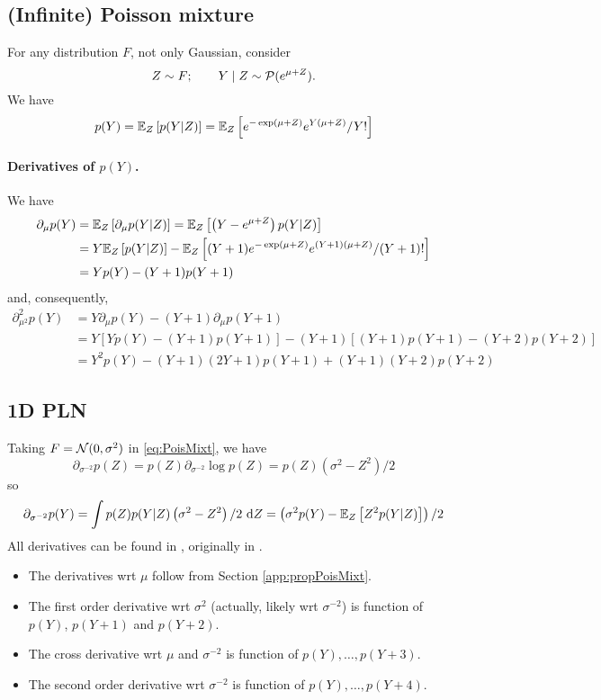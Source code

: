 \subsection{(Infinite) Poisson mixture} \label{app:propPoisMixt}

For any distribution $F$, not only Gaussian, consider
\begin{equation} \label{eq:PoisMixt}
Z \sim F; \qquad Y\;|\;Z \sim \mathcal{P}(e^{\mu + Z}).
\end{equation}
We have
$$
p(Y) = \mathbb E_Z \left[ p(Y|Z) \right] = \mathbb E_Z \left[ e^{-\exp(\mu +Z)} e^{Y(\mu+Z)} / Y! \right] 
$$

\paragraph{Derivatives of $p(Y)$.}
We have
\begin{align*}
 \partial_\mu p(Y) 
 & = \mathbb E_Z \left[ \partial_\mu p(Y|Z) \right] 
 = \mathbb E_Z \left[ \left(Y -e^{\mu +Z}\right) p(Y|Z) \right] \\
 & = Y \mathbb E_Z \left[ p(Y|Z) \right] - \mathbb E_Z \left[ (Y+1) e^{-\exp(\mu +Z)} e^{(Y+1)(\mu+Z)} / (Y+1)! \right] \\
 & = Y p(Y) - (Y+1) p(Y+1)
\end{align*}
and, consequently, 
\begin{align*}
 \partial^2_{\mu^2} p(Y) 
 & = Y \partial_\mu p(Y) - (Y+1) \partial_\mu p(Y+1) \\
 & = Y \left[ Y p(Y) - (Y+1) p(Y+1) \right]  - (Y+1) \left[ (Y+1) p(Y+1) - (Y+2) p(Y+2) \right] \\
 & = Y^2 p(Y) - (Y+1) (2Y+1) p(Y+1) + (Y+1) (Y+2) p(Y+2) 
\end{align*}

\subsection{1D PLN} \label{app:1dPLN}

Taking $F = \mathcal{N}(0, \sigma^2)$ in \eqref{eq:PoisMixt}, we have
$$
\partial_{\sigma^{-2}} p(Z) 
= p(Z) \partial_{\sigma^{-2}} \log p(Z) 
= p(Z) \left(\sigma^2 - Z^2\right)/2
$$
so
$$
\partial_{\sigma^{-2}} p(Y) 
= \int p(Z) p(Y|Z) \left(\sigma^2 - Z^2\right) / 2 \d Z 
= \left(\sigma^2 p(Y) - \Esp_Z \left[ Z^2 p(Y|Z) \right] \right) / 2 
$$
All derivatives can be found in \cite{Izs08}, originally in \cite{Sha88}. 
\begin{itemize}
 \item The derivatives wrt $\mu$ follow from Section \eqref{app:propPoisMixt}. 
 \item The first order derivative wrt $\sigma^{2}$ (actually, likely wrt $\sigma^{-2}$) is  function of $p(Y)$, $p(Y+1)$ and $p(Y+2)$.
 \item The cross derivative wrt $\mu$ and $\sigma^{-2}$ is function of $p(Y), \dots, p(Y+3)$.
 \item The second order derivative wrt $\sigma^{-2}$ is function of $p(Y), \dots, p(Y+4)$.
\end{itemize}

